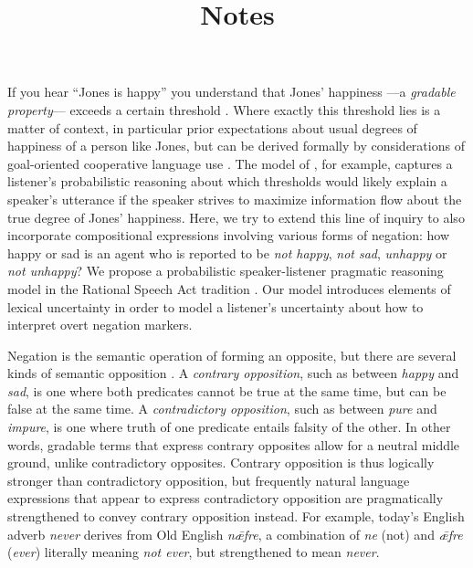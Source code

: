 \documentclass[fleqn,reqno,10pt]{article}
\title{Notes}
\author{}
\date{}
\begin{document}
If you hear ``Jones is happy'' you understand that Jones' happiness ---a \emph{gradable
  property}--- exceeds a certain threshold
\citep{KennedyMcNally2005:Scale-Structure,Kennedy2007:Vagueness-and-G}. Where exactly this
threshold lies is a matter of context, in particular prior expectations about usual degrees of
happiness of a person like Jones, but can be derived formally by considerations of
goal-oriented cooperative language use
\citep{LassiterGoodman2015:Adjectival-vagu,QingFranke2014:Gradable-Adject}. The model of
\citet{LassiterGoodman2015:Adjectival-vagu}, for example, captures a listener's probabilistic
reasoning about which thresholds would likely explain a speaker's utterance if the speaker
strives to maximize information flow about the true degree of Jones' happiness. Here, we try to
extend this line of inquiry to also incorporate compositional expressions involving various
forms of negation: how happy or sad is an agent who is reported to be \emph{not happy},
\emph{not sad}, \emph{unhappy} or \emph{not unhappy}? We propose a probabilistic
speaker-listener pragmatic reasoning model in the Rational Speech Act tradition
\citep{FrankGoodman2012:Predicting-Prag,FrankeJager2015:Probabilistic-p,GoodmanFrank2016:Pragmatic-Langu}. Our
model introduces elements of lexical uncertainty
\citep{BergenLevy2012:Thats-what-she-,BergenLevy2014:Pragmatic-Reaso} in order to model a
listener's uncertainty about how to interpret overt negation markers.

Negation is the semantic operation of forming an opposite, but there are several kinds of
semantic opposition \citep{Horn1989:A-Natural-Histo,sep-negation}. A \emph{contrary
  opposition}, such as between \emph{happy} and \emph{sad}, is one where both predicates cannot
be true at the same time, but can be false at the same time. A \emph{contradictory opposition},
such as between \emph{pure} and \emph{impure}, is one where truth of one predicate entails
falsity of the other. In other words, gradable terms that express contrary opposites allow for
a neutral middle ground, unlike contradictory opposites. Contrary opposition is thus logically
stronger than contradictory opposition, but frequently natural language expressions that appear
to express contradictory opposition are pragmatically strengthened to convey contrary
opposition instead. For example, today's English adverb \emph{never} derives from Old English
\emph{n\={\ae}fre}, a combination of \emph{ne} (not) and \emph{\={\ae}fre} (\emph{ever})
literally meaning \emph{not ever}, but strengthened to mean \emph{never}.
\end{document}
